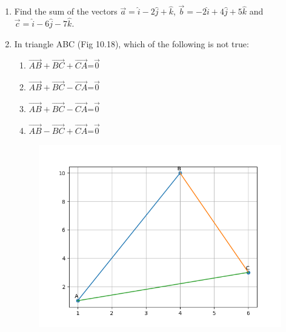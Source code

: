 \begin{enumerate}[label=\thesection.\arabic*,ref=\thesection.\theenumi]
\item Find the sum of the vectors $\vec{a}=\hat{i}-2\hat{j}+\hat{k}$, $\vec{b}=-2\hat{i}+4\hat{j}+5\hat{k}$ and $\vec{c}=\hat{i}-6\hat{j}-7\hat{k}$.
\item 

	In triangle ABC (Fig 10.18), which of the following is not true:
 \begin{enumerate}
         \item $\overrightarrow{AB}+\overrightarrow{BC}+\overrightarrow{CA}$=$\vec{0}$
         \item $\overrightarrow{AB}+\overrightarrow{BC}-\overrightarrow{CA}$=$\vec{0}$
         \item $\overrightarrow{AB}+\overrightarrow{BC}-\overrightarrow{CA}$=$\vec{0}$
         \item $\overrightarrow{AB}-\overrightarrow{BC}+\overrightarrow{CA}$=$\vec{0}$
\end{enumerate}
\begin{figure}[!ht]
\centering
\includegraphics[width = \columnwidth]{./chapters/12/10/2/18/figs/triangle.png}
\caption{}
	\label{fig:chapters/12/10/2/18/}
\end{figure}
\solution
		


\end{enumerate}
